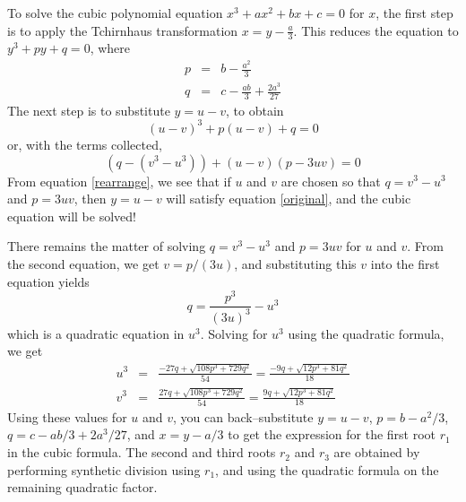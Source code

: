 \documentclass[12pt]{article}
\newcommand{\0}{\bf{0}}
\newcommand{\<}{\langle}
\renewcommand{\>}{\rangle}
\begin{document}
To solve the cubic polynomial equation $x^3 + ax^2 + bx + c = 0$ for $x$, the first step is to apply the Tchirnhaus transformation $x = y-\frac{a}{3}$. This reduces the equation to $y^3 + py + q = 0$, where
\begin{eqnarray*}
p & = & b - \frac{a^2}{3} \\
q & = & c - \frac{ab}{3} + \frac{2a^3}{27}
\end{eqnarray*}
The next step is to substitute $y = u-v$, to obtain
\begin{equation}\label{original}
(u-v)^3 + p(u-v) + q = 0
\end{equation}
or, with the terms collected,
\begin{equation}\label{rearrange}
(q - (v^3 - u^3)) + (u-v)(p - 3 u v) = 0
\end{equation}
From equation \eqref{rearrange}, we see that if $u$ and $v$ are chosen so that $q = v^3-u^3$ and $p = 3uv$, then $y = u-v$ will satisfy equation \eqref{original}, and the cubic equation will be solved!

There remains the matter of solving $q = v^3-u^3$ and $p = 3uv$ for $u$ and $v$. From the second equation, we get $v = p/(3u)$, and substituting this $v$ into the first equation yields
$$
q = \frac{p^3}{(3u)^3} - u^3
$$
which is a quadratic equation in $u^3$. Solving for $u^3$ using the quadratic formula, we get
\begin{eqnarray*}
u^3 & = & \frac{-27q + \sqrt{108 p^3 + 729 q^2}}{54} = \frac{-9q + \sqrt{12 p^3 + 81 q^2}}{18}\\
v^3 & = & \frac{27q + \sqrt{108 p^3 + 729 q^2}}{54} = \frac{9q + \sqrt{12 p^3 + 81 q^2}}{18}
\end{eqnarray*}
Using these values for $u$ and $v$, you can back--substitute $y=u-v$, $p=b-a^2/3$, $q=c-ab/3+2a^3/27$, and $x = y-a/3$ to get the expression for the first root $r_1$ in the cubic formula. The second and third roots $r_2$ and $r_3$ are obtained by performing synthetic division using $r_1$, and using the quadratic formula on the remaining quadratic factor.
\end{document}
